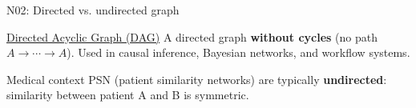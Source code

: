 \documentclass[aspectratio=169, 10pt]{beamer}
\begin{document}
\begin{frame}{N02: Directed vs. undirected graph}
    \vspace{2mm}
    
    \begin{block}{\footnotesize \href{https://en.wikipedia.org/wiki/Directed_acyclic_graph}{Directed Acyclic Graph (DAG)}}
        \footnotesize A directed graph \textbf{without cycles} (no path $A \rightarrow \cdots \rightarrow A$). Used in causal inference, Bayesian networks, and workflow systems.
    \end{block}
    
    \vspace{1mm}
    
    \begin{block}{\footnotesize Medical context}
        \footnotesize PSN (patient similarity networks) are typically \textbf{undirected}: similarity between patient A and B is symmetric.
    \end{block}
    
\end{frame}
\end{document}
